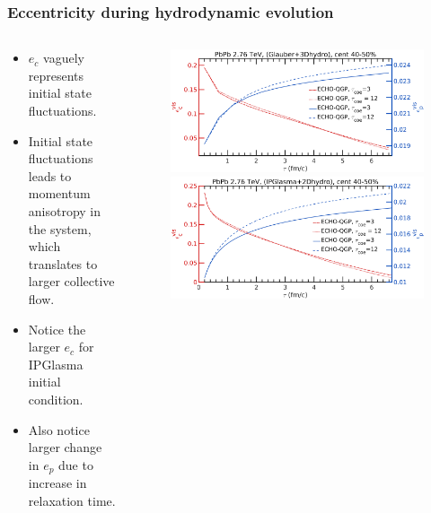 \documentclass[aspectratio=1610]{beamer}
\begin{document}
\begin{frame}
\vspace*{-3mm}
\frametitle{Eccentricity during hydrodynamic evolution}

\begin{columns}
\begin{column}{0.4\textwidth}

\begin{itemize}
\item $e_c$ vaguely represents initial state fluctuations.  

\item  Initial state fluctuations leads to momentum anisotropy in the system, which translates to larger collective flow. 

\item  Notice the larger $e_c$ for IPGlasma initial condition. 

\item Also notice larger change in $e_p$ due to increase in relaxation time. 

\end{itemize}
     
\end{column}
\begin{column}{0.6\textwidth}
    \begin{figure}
    \centering
\includegraphics[scale=0.23]{figs/EC_EP_3Dgeometric.png}
\includegraphics[scale=0.23]{figs/EP_EC_ipglasma.png}
    \end{figure}
\end{column}
\end{columns}

\begin{figure}

\end{figure}
\end{frame}
\end{document}
